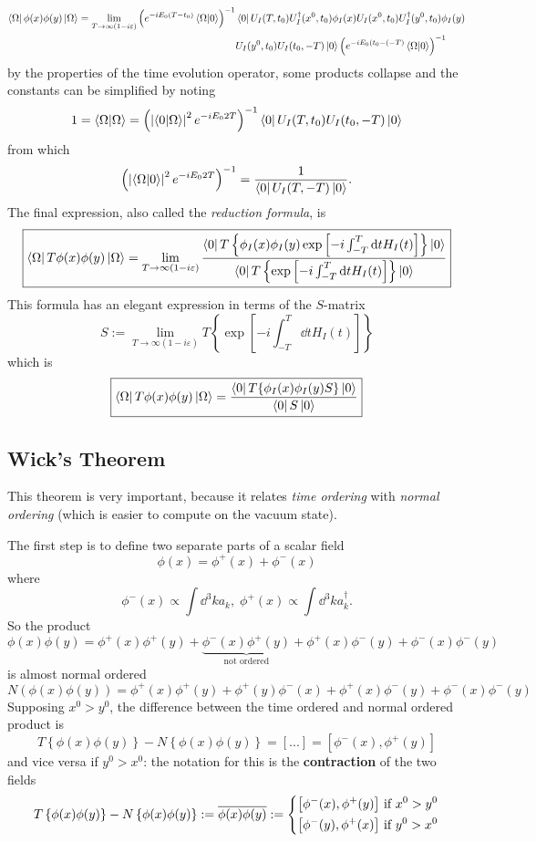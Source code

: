 \begin{align*}
\bra{\Omega}\phi(x)\phi(y)\ket{\Omega}=\lim\limits_{T\to\infty(1-i\varepsilon)}
\left(e^{-iE_0(T-t_0)}\bra{\Omega}\ket{0}\right)^{-1}&
\bra{0}U_I(T,t_0) U_I^\dagger(x^0,t_0)\phi_I(x)U_I(x^0,t_0)U^\dagger_I(y^0,t_0)
\phi_I(y)\\&
U_I(y^0,t_0)U_I(t_0,-T)\ket{0}\left(e^{-iE_0(t_0-(-T)}
\bra{\Omega}\ket{0}\right)^{-1}
\end{align*}
by the properties of the time evolution operator, some products collapse and
the constants can be simplified by noting
$$1=\bra{\Omega}\ket{\Omega} = \left(\left|\bra{0}\ket{\Omega}\right|^2e^{-iE_02T
}\right)^{-1}\bra{0}U_I(T,t_0)U_I(t_0,-T)\ket{0}$$
from which
$$\left(\left|\bra{\Omega}\ket{0}\right|^2e^{-iE_02T}\right)^{-1}=\frac{1}{
\bra{0}U_I(T,-T)\ket{0}}.$$
The final expression, also called the \textit{reduction formula}, is
$$\boxed{\bra{\Omega}T\phi(x)\phi(y)\ket{\Omega} = 
\lim\limits_{T\to\infty(1-i\varepsilon)}\frac{\bra{0}T\left\{\phi_I(x)\phi_I(y)
\exp\left[-i\int_{-T}^T \dd t H_I(t)\right]\right\}\ket{0}}
{\bra{0}T\left\{\exp\left[-i\int_{-T}^T \dd t H_I(t)\right]\right\}\ket{0}}}
$$
This formula has an elegant expression in terms of the $S$-matrix
$$S:=\lim\limits_{T\to\infty(1-i\varepsilon)} T\left\{\exp\left[-i\int_{-T}^T \dd t
H_I(t)\right]\right\}$$
which is
$$\boxed{\bra{\Omega}T\phi(x)\phi(y)\ket{\Omega} = \frac{\bra{0}T\{\phi_I(x)
\phi_I(y)S\}\ket{0}}{\bra{0}S\ket{0}}}$$
\subsection{Wick's Theorem}
This theorem is very important, because it relates \textit{time ordering}
with \textit{normal ordering} (which is easier to compute on the vacuum state).

The first step is to define two separate parts of a scalar field
$$\phi(x)=\phi^+(x)+\phi^-(x)$$
where
$$\phi^-(x)\propto \int\dd^3k a_k,\;\phi^+(x)\propto\int \dd^3ka^\dagger_k.$$
So the product
$$\phi(x)\phi(y) = \phi^+(x)\phi^+(y) + \underbrace{\phi^-(x)\phi^+(y)}_\text{not
ordered}+\phi^+(x)\phi^-(y)+\phi^-(x)\phi^-(y)$$
is almost normal ordered
$$N(\phi(x)\phi(y))=\phi^+(x)\phi^+(y) + \phi^+(y)\phi^-(x)
+\phi^+(x)\phi^-(y)+\phi^-(x)\phi^-(y)$$
Supposing $x^0>y^0$, the difference between the time ordered and normal ordered
product is
$$T\left\{\phi(x)\phi(y)\right\}-N\left\{\phi(x)\phi(y)\right\} = [...]=\left[
\phi^-(x),\phi^+(y)\right]$$
and vice versa if $y^0>x^0$: the notation for this is the \textbf{contraction}
of the two fields
$$T\left\{\phi(x)\phi(y)\right\}-N\left\{\phi(x)\phi(y)\right\}:=
\overline{\phi(x)\phi(y)}:=
\begin{dcases*}
    \left[\phi^-(x),\phi^+(y)\right]\,\text{if } x^0>y^0\\
    \left[\phi^-(y),\phi^+(x)\right]\,\text{if } y^0>x^0
\end{dcases*}
$$
